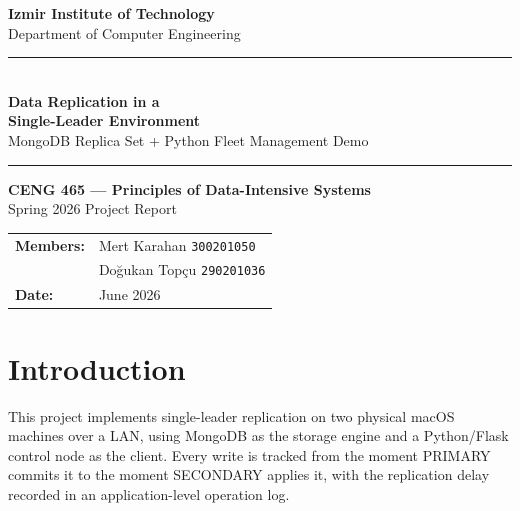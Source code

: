 \documentclass[12pt,a4paper]{article}
\begin{document}
\begin{titlepage}
  \centering
  \vspace*{1.5cm}

  {\Large\textbf{Izmir Institute of Technology}\\[0.3em]
  Department of Computer Engineering}

  \vspace{1cm}
  \rule{0.8\textwidth}{1pt}\\[0.4em]
  {\LARGE\bfseries\color{mongogreen}
    Data Replication in a\\[0.2em]
    Single-Leader Environment}\\[0.3em]
  {\large MongoDB Replica Set + Python Fleet Management Demo}\\[0.2em]
  \rule{0.8\textwidth}{1pt}

  \vspace{1cm}
  {\large\textbf{CENG 465 --- Principles of Data-Intensive Systems}}\\[0.5em]
  {\large Spring 2026 Project Report}

  \vspace{1.5cm}
  \begin{tabular}{ll}
    \textbf{Members:} & Mert Karahan \quad \texttt{300201050} \\[0.4em]
                      & Do\u{g}ukan Top\c{c}u \quad \texttt{290201036} \\[0.4em]
    \textbf{Date:}    & June 2026 \\
  \end{tabular}

  \vfill
\end{titlepage}

\tableofcontents
\newpage

\section{Introduction}

This project implements single-leader replication on two physical macOS machines over a
LAN, using MongoDB as the storage engine and a Python/Flask control node as the client.
Every write is tracked from the moment PRIMARY commits it to the moment SECONDARY applies
it, with the replication delay recorded in an application-level operation log.
\end{document}
